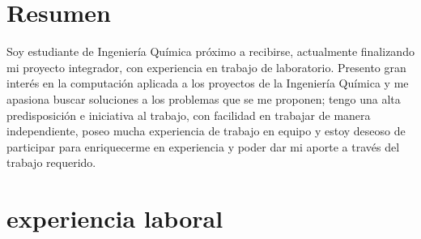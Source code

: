 \documentclass[espanol]{cv-style}     %
\begin{document}
\section{Resumen}
  \vspace{-0.2cm}
Soy estudiante de Ingeniería Química próximo a recibirse, actualmente finalizando mi proyecto integrador, con experiencia en trabajo de laboratorio. Presento gran interés en la computación aplicada a los proyectos de la Ingeniería Química y me apasiona buscar soluciones a los problemas que se me proponen; tengo una alta predisposición e iniciativa al trabajo, con facilidad en trabajar de manera independiente, poseo mucha experiencia de trabajo en equipo y estoy deseoso de participar para enriquecerme en experiencia y poder dar mi aporte a través del trabajo requerido.

\section{experiencia laboral}
\end{document}
